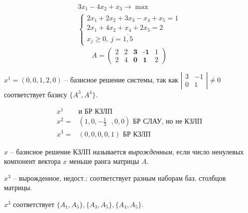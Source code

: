 \begin{eg}
	\[
		\begin{array}{l}
			3x_1 - 4x_2 + x_3 \rightarrow \max \\
			\left\{\begin{array}{l}
				       2x_1 + 2x_2 + 3x_3 - x_4 + x_5 = 1 \\
				       2x_1 + 4x_2 + x_4 + 2x_5 = 2       \\
				       x_j \geqslant 0, \ j = \overline{1,5}
			       \end{array}\right.
		\end{array}
	\]
	\[
		A = \left(\begin{array}{ccccc}
				2 & 2 & \textbf{3} & \textbf{-1} & 1 \\
				2 & 4 & \textbf{0} & \textbf{1}  & 2
			\end{array}\right)
	\]

	$x^1 = (0,0,1,2,0)$ -- базисное решение системы, так как $\left|\begin{array}{cc}
			3 & -1 \\ 0 & 1
		\end{array}\right| \ne 0$ соответствует базису $\{A^3,A^4\}$.

	\[
		\begin{array}{ll}
			x^1   & \text{и БР КЗЛП}                                               \\
			x^2 = & (1,0,\textbf{$-\frac{1}{3}$ },0,0) \text{ БР СЛАУ, но не КЗЛП} \\
			x^3 = & (0,0,0,0,1) \text{ БР КЗЛП}
		\end{array}
	\]
\end{eg}

\begin{definition}
	$x$ -- базисное решение КЗЛП называется \emph{вырожденным}, если число ненулевых компонент вектора $x$ меньше ранга матрицы $A$.

\end{definition}

\begin{note}
	$x^3$ -- вырожденное, недост.: соответствует разным наборам баз. столбцов матрицы.

	$x^3$ соответствует $\{A_1,A_5\}, \{A_3,A_5\}, \{A_4,A_5\}$.
\end{note}
